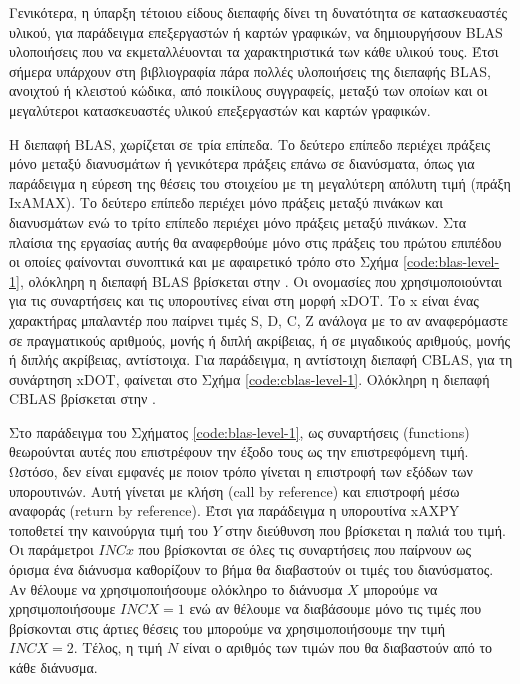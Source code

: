 Γενικότερα, η ύπαρξη τέτοιου είδους διεπαφής δίνει τη δυνατότητα σε κατασκευαστές υλικού, για παράδειγμα επεξεργαστών ή καρτών γραφικών, να δημιουργήσουν BLAS υλοποιήσεις που να εκμεταλλέυονται τα χαρακτηριστικά των κάθε υλικού τους. Έτσι σήμερα υπάρχουν στη βιβλιογραφία πάρα πολλές υλοποιήσεις της διεπαφής BLAS, ανοιχτού ή κλειστού κώδικα, από ποικίλους συγγραφείς, μεταξύ των οποίων και οι μεγαλύτεροι κατασκευαστές υλικού επεξεργαστών και καρτών γραφικών.

Η διεπαφή BLAS, χωρίζεται σε τρία επίπεδα. Το δεύτερο επίπεδο περιέχει πράξεις μόνο μεταξύ διανυσμάτων ή γενικότερα πράξεις επάνω σε διανύσματα, όπως για παράδειγμα η εύρεση της θέσεις του στοιχείου με τη μεγαλύτερη απόλυτη τιμή (πράξη IxAMAX). Το δεύτερο επίπεδο περιέχει μόνο πράξεις μεταξύ πινάκων και διανυσμάτων ενώ το τρίτο επίπεδο περιέχει μόνο πράξεις μεταξύ πινάκων. Στα πλαίσια της εργασίας αυτής θα αναφερθούμε μόνο στις πράξεις του πρώτου επιπέδου οι οποίες φαίνονται συνοπτικά και με αφαιρετικό τρόπο στο Σχήμα \ref{code:blas-level-1}, ολόκληρη η διεπαφή BLAS βρίσκεται στην . Οι ονομασίες που χρησιμοποιούνται για τις συναρτήσεις και τις υπορουτίνες είναι στη μορφή xDOT. Το x είναι ένας χαρακτήρας μπαλαντέρ που παίρνει τιμές S, D, C, Z ανάλογα με το αν αναφερόμαστε σε πραγματικούς αριθμούς, μονής ή διπλή ακρίβειας, ή σε μιγαδικούς αριθμούς, μονής ή διπλής ακρίβειας, αντίστοιχα. Για παράδειγμα, η αντίστοιχη διεπαφή CBLAS, για τη συνάρτηση xDOT, φαίνεται στο Σχήμα \ref{code:cblas-level-1}. Ολόκληρη η διεπαφή CBLAS βρίσκεται στην .

Στο παράδειγμα του Σχήματος \ref{code:blas-level-1}, ως συναρτήσεις (functions) θεωρούνται αυτές που επιστρέφουν την έξοδο τους ως την επιστρεφόμενη τιμή. Ωστόσο, δεν είναι εμφανές με ποιον τρόπο γίνεται η επιστροφή των εξόδων των υπορουτινών. Αυτή γίνεται με κλήση (call by reference) και επιστροφή μέσω αναφοράς (return by reference). Έτσι για παράδειγμα η υπορουτίνα xAXPY τοποθετεί την καινούργια τιμή του $Y$ στην διεύθυνση που βρίσκεται η παλιά του τιμή. Οι παράμετροι $INCx$ που βρίσκονται σε όλες τις συναρτήσεις που παίρνουν ως όρισμα ένα διάνυσμα καθορίζουν το βήμα θα διαβαστούν οι τιμές του διανύσματος. Αν θέλουμε να χρησιμοποιήσουμε ολόκληρο το διάνυσμα $X$ μπορούμε να χρησιμοποιήσουμε $INCX=1$ ενώ αν θέλουμε να διαβάσουμε μόνο τις τιμές που βρίσκονται στις άρτιες θέσεις του μπορούμε να χρησιμοποιήσουμε την τιμή $INCX=2$. Τέλος, η τιμή $N$ είναι ο αριθμός των τιμών που θα διαβαστούν από το κάθε διάνυσμα.

